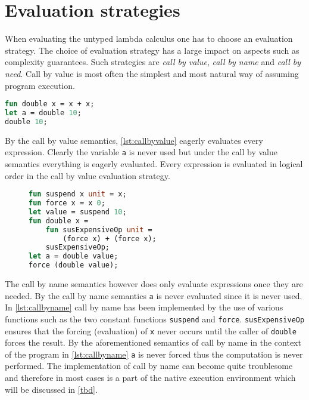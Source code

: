 \documentclass[11pt,oneside,a4paper]{report}
\begin{document}
\section{Evaluation strategies}
When evaluating the untyped lambda calculus one has to choose an evaluation strategy.
The choice of evaluation strategy has a large impact on aspects such as complexity guarantees.
Such strategies are \textit{call by value}, \textit{call by name} and \textit{call by need}.
Call by value is most often the simplest and most natural way of assuming program execution.
\begin{lstlisting}[language=ML,caption={Program that doubles values},label={lst:callbyvalue},mathescape=true]
fun double x = x + x;
let a = double 10;
double 10;
\end{lstlisting}
By the call by value semantics, \autoref{lst:callbyvalue} eagerly evaluates every expression.
Clearly the variable \texttt{a} is never used but under the call by value semantics everything is eagerly evaluated.
Every expression is evaluated in logical order in the call by value evaluation strategy.
\begin{figure}[ht]
\begin{lstlisting}[language=ML,caption={Implementation of call by name},label={lst:callbyname},mathescape=true]
fun suspend x unit = x;
fun force x = x 0;
let value = suspend 10;
fun double x = 
    fun susExpensiveOp unit = 
        (force x) + (force x);
    susExpensiveOp;
let a = double value;
force (double value);
\end{lstlisting}
\end{figure}
The call by name semantics however does only evaluate expressions once they are needed.
By the call by name semantics \texttt{a} is never evaluated since it is never used.
In \autoref{lst:callbyname} call by name has been implemented by the use of various functions such as the two constant functions \texttt{suspend} and \texttt{force}.
\texttt{susExpensiveOp} ensures that the forcing (evaluation) of \texttt{x} never occurs until the caller of \texttt{double} forces the result.
By the aforementioned semantics of call by name in the context of the program in \autoref{lst:callbyname} \texttt{a} is never forced thus the computation is never performed.
The implementation of call by name can become quite troublesome and therefore in most cases is a part of the native execution environment which will be discussed in \autoref{tbd}.
\end{document}
